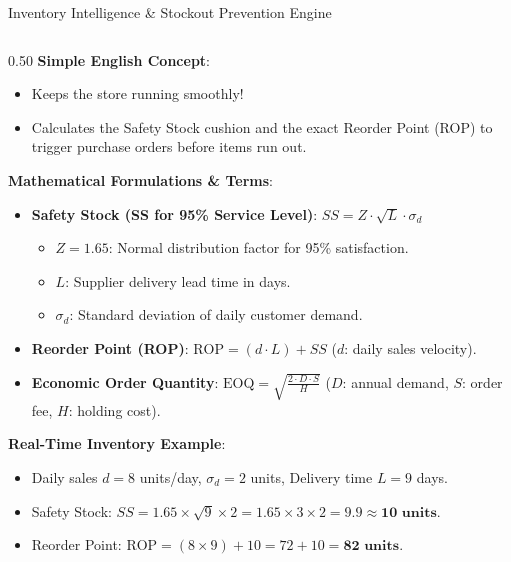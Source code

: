 \documentclass[10pt]{beamer}
\begin{document}
\begin{frame}[fragile]{Inventory Intelligence \& Stockout Prevention Engine}
\begin{columns}[T]
    \begin{column}{0.50\textwidth}
        {\color{brandred}\textbf{Simple English Concept}}:
        \begin{itemize}\scriptsize
            \item Keeps the store running smoothly!
            \item Calculates the Safety Stock cushion and the exact Reorder Point (ROP) to trigger purchase orders before items run out.
        \end{itemize}
        {\color{brandorange}\textbf{Mathematical Formulations \& Terms}}:
        \begin{itemize}\scriptsize
            \item \textbf{Safety Stock (SS for 95\% Service Level)}: $SS = Z \cdot \sqrt{L} \cdot \sigma_d$
            \begin{itemize}\tiny
                \item $Z = 1.65$: Normal distribution factor for 95\% satisfaction.
                \item $L$: Supplier delivery lead time in days.
                \item $\sigma_d$: Standard deviation of daily customer demand.
            \end{itemize}
            \item \textbf{Reorder Point (ROP)}: $\text{ROP} = (d \cdot L) + SS$ ($d$: daily sales velocity).
            \item \textbf{Economic Order Quantity}: $\text{EOQ} = \sqrt{\frac{2 \cdot D \cdot S}{H}}$ ($D$: annual demand, $S$: order fee, $H$: holding cost).
        \end{itemize}
        {\color{brandred}\textbf{Real-Time Inventory Example}}:
        \begin{itemize}\scriptsize
            \item Daily sales $d = 8$ units/day, $\sigma_d = 2$ units, Delivery time $L = 9$ days.
            \item Safety Stock: $SS = 1.65 \times \sqrt{9} \times 2 = 1.65 \times 3 \times 2 = \mathbf{9.9} \approx \mathbf{10\text{ units}}$.
            \item Reorder Point: $\text{ROP} = (8 \times 9) + 10 = 72 + 10 = \mathbf{82\text{ units}}$.

\end{itemize}
\end{column}
\end{columns}
\end{frame}
\end{document}

